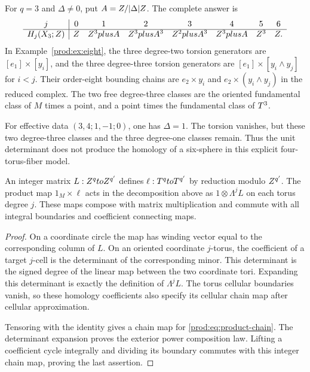 \begin{example}\label{prod:ex:six}
For $q=3$ and $\Delta\ne0$, put $A=Z/|\Delta|Z$.
The complete answer is
\[
\begin{array}{c|ccccccc}
 j&0&1&2&3&4&5&6\\\hline
 H_j(X_3;Z)&Z&Z^3plus A&Z^3plus A^3&
 Z^2plus A^3&Z^3plus A&Z^3&Z.
\end{array}
\]
In Example~\ref{prod:ex:eight}, the three degree-two torsion generators
are $[e_1]\times[y_i]$, and the three degree-three torsion generators
are $[e_1]\times[y_i\wedge y_j]$ for $i<j$.
Their order-eight bounding chains are $e_2\times y_i$ and
$e_2\times(y_i\wedge y_j)$ in the reduced complex.
The two free degree-three classes are the oriented fundamental class
of $M$ times a point, and a point times the fundamental class of $T^3$.

For effective data $(3,4;1,-1;0)$, one has $\Delta=1$.
The torsion vanishes, but these two degree-three classes and the three
degree-one classes remain.  Thus the unit determinant does not produce
the homology of a six-sphere in this explicit four-torus-fiber model.
\end{example}

\begin{proposition}\label{prod:prop:naturality}
An integer matrix $L:Z^qtoZ^{q'}$ defines
$\ell:T^qtoT^{q'}$ by reduction modulo $Z^{q'}$.
The product map $1_M\times\ell$ acts in the decomposition above as
$1\otimes\Lambda^jL$ on each torus degree $j$.
These maps compose with matrix multiplication and commute with all
integral boundaries and coefficient connecting maps.
\end{proposition}

\begin{proof}
On a coordinate circle the map has winding vector equal to the
corresponding column of $L$.
On an oriented coordinate $j$-torus, the coefficient of a target
$j$-cell is the determinant of the corresponding minor.
This determinant is the signed degree of the linear map between the two
coordinate tori.
Expanding this determinant is exactly the definition of $\Lambda^jL$.
The torus cellular boundaries vanish, so these homology coefficients
also specify its cellular chain map after cellular approximation.

Tensoring with the identity gives a chain map for
\eqref{prod:eq:product-chain}.  The determinant expansion proves the exterior
power composition law.  Lifting a coefficient cycle integrally and
dividing its boundary commutes with this integer chain map, proving the
last assertion.
\end{proof}

